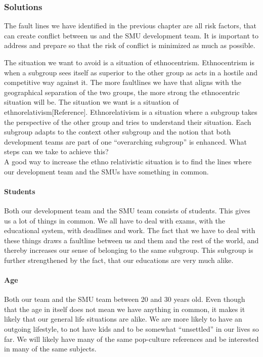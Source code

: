 \documentclass[a4paper,11pt,report]{article}
\begin{document}
{\subsubsection{Solutions}
The fault lines we have identified in the previous chapter are all risk factors, that can create conflict between us and the SMU development team. It is important to address and prepare so that the risk of conflict is minimized as much as possible.

The situation we want to avoid is a situation of ethnocentrism. Ethnocentrism is when a subgroup sees itself as superior to the other group as acts in a hostile and competitive way against it. The more faultlines we have that aligns with the geographical separation of the two groups, the more strong the ethnocentric situation will be. The situation we want is a situation of ethnorelativism[Reference]. Ethnorelativism is a situation where a subgroup takes the perspective of the other group and tries to understand their situation. Each subgroup adapts to the context other subgroup and the notion that both development teams are part of one “overarching subgroup” is enhanced. What steps can we take to achieve this?\\

A good way to increase the ethno relativistic situation is to find the lines where our development team and the SMUs have something in common. \\

\paragraph{Students}
Both our development team and the SMU team consists of students. This gives us a lot of things in common. We all have to deal with exams, with the educational system, with deadlines and work. The fact that we have to deal with these things draws a faultline between us and them and the rest of the world, and thereby increases our sense of belonging to the same subgroup. This subgroup is further strengthened by the fact, that our educations are very much alike. \\

\paragraph{Age}
Both our team and the SMU team between 20 and 30 years old. Even though that the age in itself does not mean we have anything in common, it makes it likely that our general life situations are alike. We are more likely to have an outgoing lifestyle, to not have kids and to be somewhat “unsettled” in our lives so far. We will likely have many of the same pop-culture references and be interested in many of the same subjects. 

}
\end{document}
